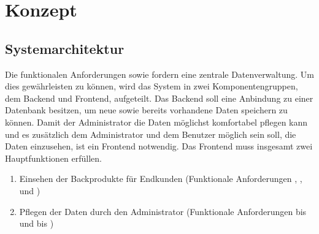 \chapter{Konzept}

\section{Systemarchitektur} \label{systemarchitektur}
Die funktionalen Anforderungen  sowie  fordern eine zentrale Datenverwaltung.
Um dies gewährleisten zu können, wird das System in zwei Komponentengruppen, dem Backend und Frontend, aufgeteilt.
Das Backend soll eine Anbindung zu einer Datenbank besitzen, um neue sowie bereits vorhandene Daten speichern zu können.
Damit der Administrator die Daten möglichst komfortabel pflegen kann und es zusätzlich dem Administrator und dem Benutzer möglich sein soll, die Daten einzusehen, ist ein Frontend notwendig.
Das Frontend muss insgesamt zwei Hauptfunktionen erfüllen.

\begin{enumerate}
	\item Einsehen der Backprodukte für Endkunden (Funktionale Anforderungen , ,  und )
	\item Pflegen der Daten durch den Administrator (Funktionale Anforderungen  bis  und  bis )
\end{enumerate}


